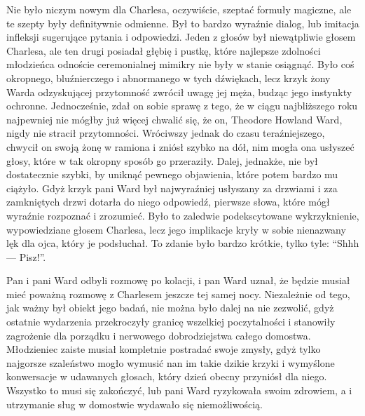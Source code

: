 Nie było niczym nowym dla Charlesa, oczywiście, szeptać formuły magiczne, ale te szepty były definitywnie odmienne. Był to bardzo wyraźnie dialog, lub imitacja infleksji sugerujące pytania i odpowiedzi. Jeden z głosów był niewątpliwie głosem Charlesa, ale ten drugi posiadał głębię i pustkę, które najlepsze zdolności młodzieńca odnoście ceremonialnej mimikry nie były w stanie osiągnąć. Było coś okropnego, bluźnierczego i abnormanego w tych dźwiękach, lecz krzyk żony Warda odzyskującej przytomność zwrócił uwagę jej męża, budząc jego instynkty ochronne. Jednocześnie, zdał on sobie sprawę z tego, że w ciągu najbliższego roku najpewniej nie mógłby już więcej chwalić się, że on, Theodore Howland Ward, nigdy nie stracił przytomności. Wróciwszy jednak do czasu teraźniejszego, chwycił on swoją żonę w ramiona i zniósł szybko na dół, nim mogła ona usłyszeć głosy, które w tak okropny sposób go przeraziły.  Dalej, jednakże, nie był dostatecznie szybki, by uniknąć pewnego objawienia, które potem bardzo mu ciążyło. Gdyż krzyk pani Ward był najwyraźniej usłyszany za drzwiami i zza zamkniętych drzwi dotarła do niego odpowiedź, pierwsze słowa, które mógł wyraźnie rozpoznać i zrozumieć. Było to zaledwie podekscytowane wykrzyknienie, wypowiedziane głosem Charlesa, lecz jego implikacje kryły w sobie nienazwany lęk dla ojca, który je podsłuchał. To zdanie było bardzo krótkie, tylko tyle: ``Shhh — Pisz!''.

Pan i pani Ward odbyli rozmowę po kolacji, i pan Ward uznał, że będzie musiał mieć poważną rozmowę z Charlesem jeszcze tej samej nocy. Niezależnie od tego, jak ważny był obiekt jego badań, nie można było dalej na nie zezwolić, gdyż ostatnie wydarzenia przekroczyły granicę wszelkiej poczytalności i stanowiły zagrożenie dla porządku i nerwowego dobrodziejstwa całego domostwa. Młodzieniec zaiste musiał kompletnie postradać swoje zmysły, gdyż tylko najgorsze szaleństwo mogło wymusić nan im takie dzikie krzyki i wymyślone konwersacje w udawanych głosach, który dzień obecny przyniósł dla niego. Wszystko to musi się zakończyć, lub pani Ward ryzykowała swoim zdrowiem, a i utrzymanie sług w domostwie wydawało się niemożliwością.   

